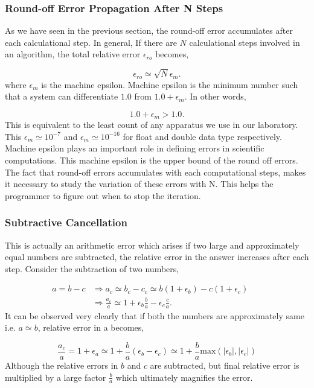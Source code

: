 \documentclass[a4,12pt]{article}
\numberwithin{equation}{subsection}
\begin{document}
\subsubsection{Round-off Error Propagation After N Steps}
As we have seen in the previous section, the round-off error accumulates after each calculational step. In general, If there are $N$ calculational steps involved in an algorithm, the total relative error $\epsilon_{ro}$ becomes,

$$\epsilon_{ro} \simeq \sqrt N \epsilon_m.$$
where $\epsilon_m$ is the machine epsilon. Machine epsilon is the minimum number such that a system can differentiate $1.0$ from $1.0+\epsilon_m$. In other words,

$$1.0 + \epsilon_m > 1.0.$$
 This is equivalent to the least count of any apparatus we use in our laboratory. This $\epsilon_m \simeq 10^{-7}$ and $\epsilon_m \simeq 10^{-16}$ for float and double data type respectively. Machine epsilon plays an important role in defining errors in scientific computations. This machine epsilon is the upper bound of the round off errors.
\newline
The fact that round-off errors accumulates with each computational steps, makes it necessary to study the variation of these errors with N. This helps the programmer to figure out when to stop the iteration.

\subsubsection{Subtractive Cancellation}
This is actually an arithmetic error which arises if two large and approximately equal numbers are subtracted, the relative error in the answer increases after each step. Consider the subtraction of two numbers,

\begin{align}
a = b - c & \Rightarrow a_c \simeq b_c - c_c \simeq b(1+\epsilon_b) - c(1+\epsilon_c) && \\
& \Rightarrow \frac{a_c}{a} \simeq 1+ \epsilon_b \frac{b}{a} - \epsilon_c \frac{c}{a} .&&
\end{align}
It can be observed very clearly that if both the numbers are approximately same i.e. $a \simeq b$, relative error in a becomes,

\begin{equation}
  \frac{a_c}{a} = 1 + \epsilon_a \simeq 1+ \frac{b}{a}(\epsilon_b-\epsilon_c) \simeq 1+\frac{b}{a} \text{max}(|\epsilon_b|, |\epsilon_c|)
\end{equation}
Although the relative errors in $b$ and $c$ are subtracted, but final relative error is multiplied by a large factor $\frac{b}{a}$ which ultimately magnifies the error.
\end{document}
